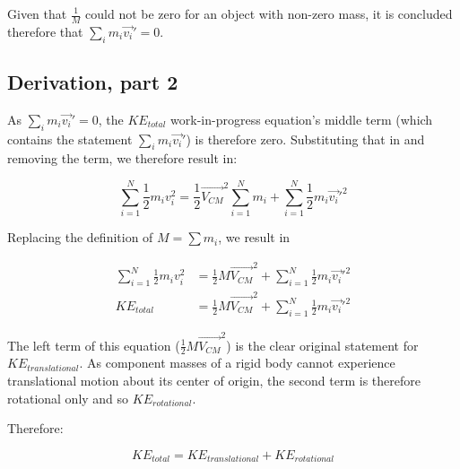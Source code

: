 \documentclass[letterpaper]{article}
\begin{document}
Given that \(\frac{1}{M}\) could not be zero for an object with non-zero mass, it is concluded therefore that \(\sum_i m_i \vec{v_i}' = 0\).

\subsection{Derivation, part 2}
\label{sec:org9646168}
As \(\sum_i m_i \vec{v_i}' = 0\), the \(KE_{total}\) work-in-progress equation's middle term (which contains the statement \(\sum_i m_i \vec{v_i}'\)) is therefore zero. Substituting that in and removing the term, we therefore result in:

\begin{equation}
     \sum^N_{i=1} \frac{1}{2}m_iv_i^2 = \frac{1}{2} \vec{V_{CM}}^2 \sum^N_{i=1} m_i + \sum^N_{i=1} \frac{1}{2}m_i\vec{v_i}'^2
\end{equation}

Replacing the definition of \(M = \sum m_i\), we result in

\begin{align}
     \sum^N_{i=1} \frac{1}{2}m_iv_i^2 &= \frac{1}{2} M \vec{V_{CM}}^2 + \sum^N_{i=1} \frac{1}{2}m_i\vec{v_i}'^2 \\
     KE_{total} &= \frac{1}{2} M \vec{V_{CM}}^2 + \sum^N_{i=1} \frac{1}{2}m_i\vec{v_i}'^2
\end{align}

The left term of this equation (\(\frac{1}{2} M \vec{V_{CM}}^2\)) is the clear original statement for \(KE_{translational}\). As component masses of a rigid body cannot experience translational motion about its center of origin, the second term is therefore rotational only and so \(KE_{rotational}\). 

Therefore:

\begin{equation}
    KE_{total} = KE_{translational}+KE_{rotational}
\end{equation}
\end{document}
